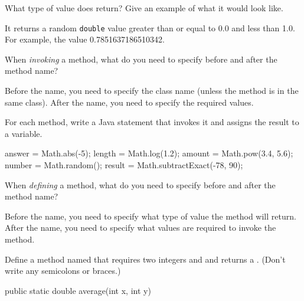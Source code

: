 \Q What type of value does  return? Give an example of what it would look like.

\begin{answer}
It returns a random \texttt{double} value greater than or equal to 0.0 and less than 1.0.
For example, the value 0.7851637186510342.
\end{answer}


\Q When \emph{invoking} a method, what do you need to specify before and after the method name?

\begin{answer}
Before the name, you need to specify the class name (unless the method is in the same class).
After the name, you need to specify the required values.
\end{answer}


\Q For each method, write a Java statement that invokes it and assigns the result to a variable.

\begin{answer}[8em]
\vspace{-1ex}
\begin{javaans}
answer = Math.abs(-5);
length = Math.log(1.2);
amount = Math.pow(3.4, 5.6);
number = Math.random();
result = Math.subtractExact(-78, 90);
\end{javaans}
\end{answer}


\Q When \emph{defining} a method, what do you need to specify before and after the method name?

\begin{answer}
Before the name, you need to specify what type of value the method will return.
After the name, you need to specify what values are required to invoke the method.
\end{answer}


\Q Define a method named  that requires two integers  and  and returns a . (Don't write any semicolons or braces.)

\begin{answer}
\begin{javaans}
public static double average(int x, int y)
\end{javaans}
\end{answer}





